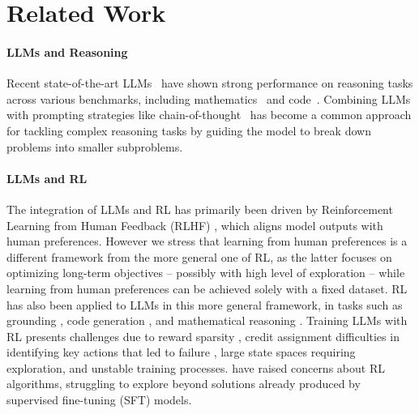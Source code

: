 \section{Related Work}
\paragraph{LLMs and Reasoning}
Recent state-of-the-art LLMs~\citep{llama2,GPT4} have shown strong performance on reasoning tasks across various benchmarks, including mathematics~\citep{cobbe2021trainingverifierssolvemath, hendrycks2021measuringmathematicalproblemsolving} and code~\citep{chen2021evaluatinglargelanguagemodels, Li_2022}. Combining LLMs with prompting strategies like chain-of-thought~\citep{wei2023chainofthoughtpromptingelicitsreasoning} has become a common approach for tackling complex reasoning tasks by guiding the model to break down problems into smaller subproblems.

\paragraph{LLMs and RL}
The integration of LLMs and RL has primarily been driven by Reinforcement Learning from Human Feedback (RLHF) \citep{NIPS2017_d5e2c0ad, ziegler2019fine, NEURIPS2020_1f89885d}, which aligns model outputs with human preferences.
However we stress that learning from human preferences is a different framework from the more general one of RL, as the latter focuses on optimizing long-term objectives -- possibly with high level of exploration -- while learning from human preferences can be achieved solely with a fixed dataset.
RL has also been applied to LLMs in this more general framework, in tasks such as grounding \citep{yao2020calmexplorelanguagemodels, carta2023groundinglargelanguagemodels}, code generation \citep{NEURIPS2022_8636419d}, and mathematical reasoning \cite{havrilla2024teachinglargelanguagemodels}.
Training LLMs with RL presents challenges due to reward sparsity \citep{cao2024sparserewardsenhancingreinforcement}, credit assignment difficulties in identifying key actions that led to failure \citep{hwang2024selfexploreenhancingmathematicalreasoning}, large state spaces requiring exploration, and unstable training processes. \citet{havrilla2024teachinglargelanguagemodels} have raised concerns about RL algorithms, struggling to explore beyond solutions already produced by supervised fine-tuning (SFT) models.

